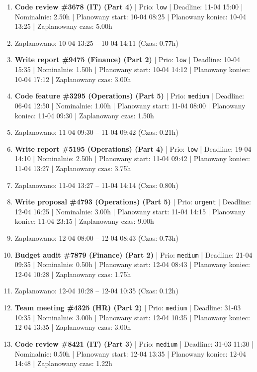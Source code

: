 {\begin{enumerate}
  \item [\textbf{14699}] \textbf{Code review \#3678 (IT) (Part 4)} | Prio: \texttt{low} | Deadline: 11-04 15:00 | Nominalnie: 2.50h | Planowany start: 10-04 08:25 | Planowany koniec: 10-04 13:25 | Zaplanowany czas: 5.00h
  \item [\textbf{PRZERWA}] Zaplanowano: 10-04 13:25 -- 10-04 14:11 (Czas: 0.77h)
  \item [\textbf{14685}] \textbf{Write report \#9475 (Finance) (Part 2)} | Prio: \texttt{low} | Deadline: 10-04 15:35 | Nominalnie: 1.50h | Planowany start: 10-04 14:12 | Planowany koniec: 10-04 17:12 | Zaplanowany czas: 3.00h
  \item [\textbf{14645}] \textbf{Code feature \#3295 (Operations) (Part 5)} | Prio: \texttt{medium} | Deadline: 06-04 12:50 | Nominalnie: 1.00h | Planowany start: 11-04 08:00 | Planowany koniec: 11-04 09:30 | Zaplanowany czas: 1.50h
  \item [\textbf{PRZERWA}] Zaplanowano: 11-04 09:30 -- 11-04 09:42 (Czas: 0.21h)
  \item [\textbf{14687}] \textbf{Write report \#5195 (Operations) (Part 4)} | Prio: \texttt{low} | Deadline: 19-04 14:10 | Nominalnie: 2.50h | Planowany start: 11-04 09:42 | Planowany koniec: 11-04 13:27 | Zaplanowany czas: 3.75h
  \item [\textbf{PRZERWA}] Zaplanowano: 11-04 13:27 -- 11-04 14:14 (Czas: 0.80h)
  \item [\textbf{14600}] \textbf{Write proposal \#4793 (Operations) (Part 5)} | Prio: \texttt{urgent} | Deadline: 12-04 16:25 | Nominalnie: 3.00h | Planowany start: 11-04 14:15 | Planowany koniec: 11-04 23:15 | Zaplanowany czas: 9.00h
  \item [\textbf{PRZERWA}] Zaplanowano: 12-04 08:00 -- 12-04 08:43 (Czas: 0.73h)
  \item [\textbf{14644}] \textbf{Budget audit \#7879 (Finance) (Part 2)} | Prio: \texttt{medium} | Deadline: 21-04 09:35 | Nominalnie: 0.50h | Planowany start: 12-04 08:43 | Planowany koniec: 12-04 10:28 | Zaplanowany czas: 1.75h
  \item [\textbf{PRZERWA}] Zaplanowano: 12-04 10:28 -- 12-04 10:35 (Czas: 0.12h)
  \item [\textbf{14641}] \textbf{Team meeting \#4325 (HR) (Part 2)} | Prio: \texttt{medium} | Deadline: 31-03 10:35 | Nominalnie: 3.00h | Planowany start: 12-04 10:35 | Planowany koniec: 12-04 13:35 | Zaplanowany czas: 3.00h
  \item [\textbf{14665}] \textbf{Code review \#8421 (IT) (Part 3)} | Prio: \texttt{medium} | Deadline: 31-03 11:30 | Nominalnie: 0.50h | Planowany start: 12-04 13:35 | Planowany koniec: 12-04 14:48 | Zaplanowany czas: 1.22h

\end{enumerate}}
